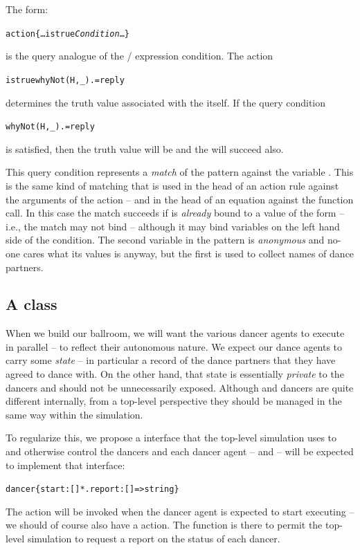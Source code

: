 The form:
\begin{alltt}
action\{ \ldots istrue \emph{Condition} \ldots\}
\end{alltt}
is the query analogue of the / expression condition. The action
\begin{alltt}
istrue whyNot(H,\_).=reply
\end{alltt}
determines the truth value associated with the  itself. If the query condition
\begin{alltt}
whyNot(H,\_).=reply
\end{alltt}
is satisfied, then the truth value will be  and the  will succeed also.

This query condition represents a \emph{match} of the pattern  against the variable . This is the same kind of matching that is used in the head of an action rule against the arguments of the action -- and in the head of an equation against the function call. In this case the match succeeds if  is \emph{already} bound to a value of the form  -- i.e., the match may not bind  -- although it may bind variables on the left hand side of the condition. The second variable in the  pattern is \emph{anonymous} and no-one cares what its values is anyway, but the first is used to collect names of dance partners.

\subsection{A \mail class}
When we build our ballroom, we will want the various dancer agents to execute in parallel -- to reflect their autonomous nature. We expect our dance agents to carry some \emph{state} -- in particular a record of the dance partners that they have agreed to dance with. On the other hand, that state is essentially \emph{private} to the dancers and should not be unnecessarily exposed. Although  and  dancers are quite different internally, from a top-level perspective they should be managed in the same way within the simulation.

To regularize this, we propose a  interface that the top-level simulation uses to  and otherwise control the dancers and each dancer agent -- \mail and \phemail -- will be expected to implement that interface:
\begin{alltt}
dancer \typearrow{} \{ start:[]*. report:[]=>string \}
\end{alltt}
The  action will be invoked when the dancer agent is expected to start executing -- we should of course also have a  action. The  function is there to permit the top-level simulation to request a report on the status of each dancer.

